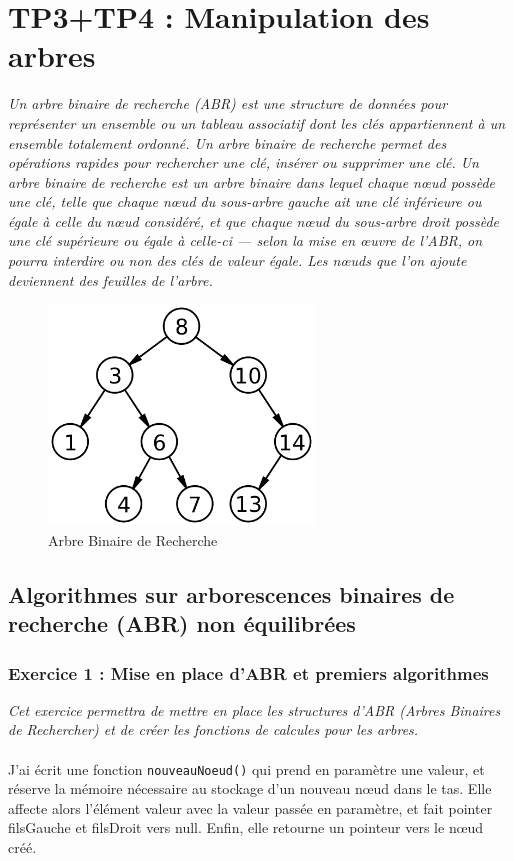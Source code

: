 \chapter{TP3+TP4 : Manipulation des arbres}
\textit{Un arbre binaire de recherche (ABR) est une structure de données pour représenter un ensemble ou un tableau associatif dont les clés appartiennent à un ensemble totalement ordonné. Un arbre binaire de recherche permet des opérations rapides pour rechercher une clé, insérer ou supprimer une clé. Un arbre binaire de recherche est un arbre binaire dans lequel chaque nœud possède une clé, telle que chaque nœud du sous-arbre gauche ait une clé inférieure ou égale à celle du nœud considéré, et que chaque nœud du sous-arbre droit possède une clé supérieure ou égale à celle-ci — selon la mise en œuvre de l'ABR, on pourra interdire ou non des clés de valeur égale. Les nœuds que l'on ajoute deviennent des feuilles de l'arbre.}
\begin{figure}[H]
\centering
\includegraphics[width=200pt]{./cpp/Pictures/tp3+tp4-ABR}
\caption{Arbre Binaire de Recherche}
\label{Arbre Binaire de Recherche}
\end{figure}

\section{Algorithmes sur arborescences binaires de recherche (ABR) non équilibrées}

\subsection{Exercice 1 : Mise en place d’ABR et premiers algorithmes}
\textit{Cet exercice permettra de mettre en place les structures d'ABR (Arbres Binaires de Rechercher) et de créer les fonctions de calcules pour les arbres.}
\\\\
J'ai écrit une fonction \texttt{nouveauNoeud()} qui prend en paramètre une valeur, et réserve la mémoire nécessaire au stockage d’un nouveau nœud dans le tas. Elle affecte alors l’élément valeur avec la valeur passée en paramètre, et fait pointer filsGauche et filsDroit vers null. Enfin, elle retourne un pointeur vers le nœud créé.
\inputminted[linenos,firstline=30,lastline=69]{cpp}{../sources/cpp/TP3-4/arbresBasiques.c}

